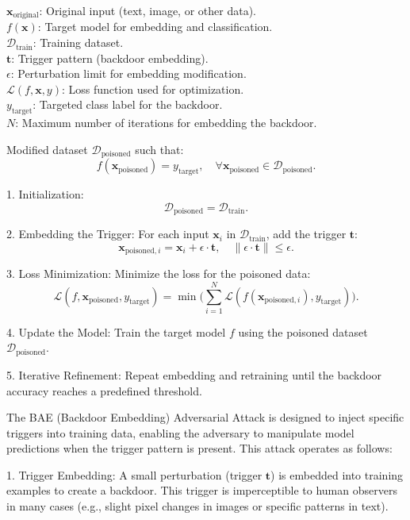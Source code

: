 $\mathbf{x}_{\text{original}}$: Original input (text, image, or other data). \\
$f(\mathbf{x})$: Target model for embedding and classification. \\
$\mathcal{D}_{\text{train}}$: Training dataset. \\
$\mathbf{t}$: Trigger pattern (backdoor embedding). \\
$\epsilon$: Perturbation limit for embedding modification. \\
$\mathcal{L}(f, \mathbf{x}, y)$: Loss function used for optimization. \\
$y_{\text{target}}$: Targeted class label for the backdoor. \\
$N$: Maximum number of iterations for embedding the backdoor.

Modified dataset $\mathcal{D}_{\text{poisoned}}$ such that:
\[
f(\mathbf{x}_{\text{poisoned}}) = y_{\text{target}}, \quad \forall \mathbf{x}_{\text{poisoned}} \in \mathcal{D}_{\text{poisoned}}.
\]

1. Initialization:
   \[
   \mathcal{D}_{\text{poisoned}} = \mathcal{D}_{\text{train}}.
   \]

2. Embedding the Trigger:
   For each input $\mathbf{x}_i$ in $\mathcal{D}_{\text{train}}$, add the trigger $\mathbf{t}$:
   \[
   \mathbf{x}_{\text{poisoned}, i} = \mathbf{x}_i + \epsilon \cdot \mathbf{t}, \quad \|\epsilon \cdot \mathbf{t}\| \leq \epsilon.
   \]

3. Loss Minimization:
   Minimize the loss for the poisoned data:
   \[
   \mathcal{L}(f, \mathbf{x}_{\text{poisoned}}, y_{\text{target}}) = \min \bigg( \sum_{i=1}^N \mathcal{L}(f(\mathbf{x}_{\text{poisoned}, i}), y_{\text{target}}) \bigg).
   \]

4. Update the Model:
   Train the target model $f$ using the poisoned dataset $\mathcal{D}_{\text{poisoned}}$.

5. Iterative Refinement:
   Repeat embedding and retraining until the backdoor accuracy reaches a predefined threshold.

The BAE (Backdoor Embedding) Adversarial Attack is designed to inject specific triggers into training data, enabling the adversary to manipulate model predictions when the trigger pattern is present. This attack operates as follows:

1. Trigger Embedding: A small perturbation (trigger $\mathbf{t}$) is embedded into training examples to create a backdoor. This trigger is imperceptible to human observers in many cases (e.g., slight pixel changes in images or specific patterns in text).

